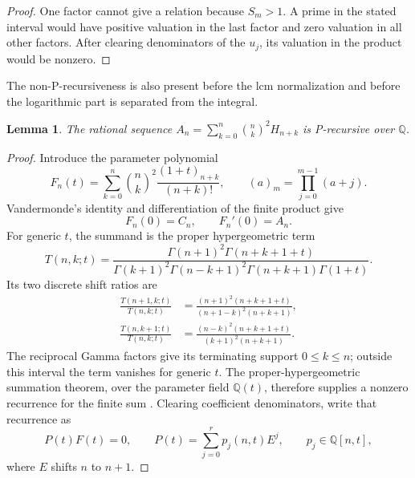 \documentclass[11pt,a4paper]{article}
\newtheorem{lemma}[theorem]{Lemma}
\theoremstyle{definition}
\theoremstyle{remark}
\numberwithin{equation}{section}
\begin{document}
\begin{proof}
One factor cannot give a relation because $S_m>1$.  A prime in the
stated interval would have positive valuation in the last factor and
zero valuation in all other factors.  After clearing denominators of
the $u_j$, its valuation in the product would be nonzero.
\end{proof}

The non-P-recursiveness is also present before the lcm normalization
and before the logarithmic part is separated from the integral.

\begin{lemma}\label{pm:str:A-holonomic}
The rational sequence $A_n=\sum_{k=0}^n\binom nk^2H_{n+k}$ is
P-recursive over $\mathbb Q$.
\end{lemma}

\begin{proof}
Introduce the parameter polynomial
\begin{equation}\label{pm:str:F-parameter}
 F_n(t)=\sum_{k=0}^n\binom nk^2\frac{(1+t)_{n+k}}{(n+k)!},
 \qquad (a)_m=\prod_{j=0}^{m-1}(a+j).
\end{equation}
Vandermonde's identity and differentiation of the finite product give
\begin{equation}\label{pm:str:F-specialize}
 F_n(0)=C_n,\qquad F_n'(0)=A_n.
\end{equation}
For generic $t$, the summand is the proper hypergeometric term
\[
 T(n,k;t)=\frac{\Gamma(n+1)^2\Gamma(n+k+1+t)}
 {\Gamma(k+1)^2\Gamma(n-k+1)^2
  \Gamma(n+k+1)\Gamma(1+t)}.
\]
Its two discrete shift ratios are
\begin{align*}
 \frac{T(n+1,k;t)}{T(n,k;t)}
 &=\frac{(n+1)^2(n+k+1+t)}{(n+1-k)^2(n+k+1)},\\
 \frac{T(n,k+1;t)}{T(n,k;t)}
 &=\frac{(n-k)^2(n+k+1+t)}{(k+1)^2(n+k+1)}.
\end{align*}
The reciprocal Gamma factors give its terminating support $0\leq k\leq n$;
outside this interval the term vanishes for generic $t$.  The
proper-hypergeometric summation theorem, over the parameter field
$\mathbb Q(t)$, therefore supplies a nonzero recurrence for the finite
sum \cite[Sections 2.1 and 3.3]{pm:WZ1992}.  Clearing coefficient
denominators, write that recurrence as
\begin{equation}\label{pm:str:parameter-operator}
 P(t)F(t)=0,\qquad
 P(t)=\sum_{j=0}^r p_j(n,t)E^j,
 \qquad p_j\in\mathbb Q[n,t],
\end{equation}
where $E$ shifts $n$ to $n+1$.


\end{proof}
\end{document}
